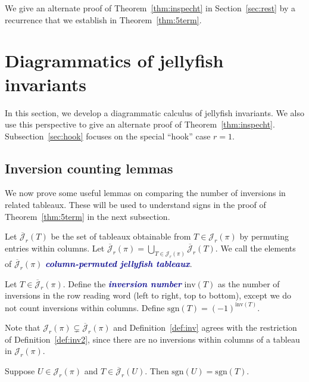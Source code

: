 \documentclass[ALCO, Unicode]{cedram}
\numberwithin{equation}{section}
\newcommand{\rstab}{\mathcal{J}}
\newcommand{\rstabgen}{\overline{\mathcal{J}}}
\newcommand{\inv}{\mathrm{inv}}
\newcommand{\sgn}{\mathrm{sgn}}
\newcommand{\newword}[1]{\textcolor{darkblue}{\textbf{\emph{#1}}}}
\begin{document}
We give an alternate proof of Theorem~\ref{thm:inspecht} in Section~\ref{sec:rest} by a recurrence that we establish in Theorem~\ref{thm:5term}.

\section{Diagrammatics of jellyfish invariants}\label{sec:diagrammatics}

In this section, we develop a diagrammatic calculus of jellyfish invariants. We also use this perspective to give an alternate proof of Theorem~\ref{thm:inspecht}. Subsection~\ref{sec:hook} focuses on the special ``hook'' case $r=1$.

\subsection{Inversion counting lemmas}
\label{sec:lemmas}

We now prove some useful lemmas on comparing the number of inversions in related tableaux. These will be used to understand signs in the proof of Theorem~\ref{thm:5term} in the next subsection.

\begin{definition}
Let $\rstabgen_r(T)$ be the set of tableaux obtainable from $T\in\rstab_r(\pi)$ by permuting entries within columns. Let $\rstabgen_r(\pi)=\displaystyle\bigcup_{T\in\rstab_r(\pi)}\rstabgen_r(T)$. We call the elements of $\rstabgen_r(\pi)$ \newword{column-permuted jellyfish tableaux}.
\end{definition}

\begin{definition}
\label{def:inv2}
Let $T\in \rstabgen_r(\pi)$. Define the \newword{inversion number} $\inv(T)$ as the number of inversions in the row reading word (left to right, top to bottom), except we do not count inversions within columns. Define $\sgn(T)=(-1)^{\inv(T)}$.
\end{definition}


Note that $\rstab_r(\pi) \subsetneq \rstabgen_r(\pi)$ and Definition~\ref{def:inv} agrees with the restriction of Definition~\ref{def:inv2}, since there are no inversions within columns of a tableau in $\rstab_r(\pi)$.


\begin{lemma}
\label{lem:row_col_swap}
Suppose $U\in \rstab_r(\pi)$ and $T\in \rstabgen_r(U)$. Then $\sgn(U)=\sgn(T)$.
\end{lemma}
\end{document}
